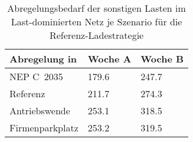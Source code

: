 {
\renewcommand{\arraystretch}{1.2}%
\begin{table}[H]
	\begin{center}
		\caption{Abregelungsbedarf der sonstigen Lasten im Last-dominierten Netz je Szenario für die Referenz-Ladestrategie}
		\begin{tabu} to 0.6\textwidth {X[1.5] X[1, r] X[1, r]}
			\toprule
			Abregelung in   \si{\mwh}    & Woche A     & Woche B     \\ \midrule
			NEP C~\num{2035}             & \num{179.6} & \num{247.7} \\
			Referenz                     & \num{211.7} & \num{274.3} \\
			Antriebswende                & \num{253.1} & \num{318.5} \\
			\glqq Firmenparkplatz\grqq{} & \num{253.2} & \num{319.5} \\ \bottomrule
		\end{tabu}
		\label{tab:load_dominated_load_cur}
	\end{center}
	\vspace{-3mm}%
\end{table}
}